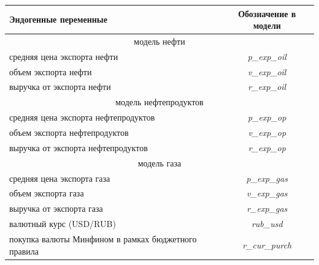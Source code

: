 \documentclass[a4paper, 14pt]{extarticle}
\begin{document}
	\begin{center}
		\small
		\begin{tabular}{ l | c }
			\toprule
			  Эндогенные переменные  &  Обозначение в модели  \\
			\midrule
			\multicolumn{2}{c}{модель нефти}\\
			\midrule
			 средняя цена экспорта нефти & \textit{ p\_exp\_oil } \\ 
			 объем экспорта нефти & \textit{ v\_exp\_oil } \\
			выручка от экспорта нефти &  \textit{ r\_exp\_oil } \\ 
			\midrule
			\multicolumn{2}{c}{модель нефтепродуктов} \\
			\midrule
			средняя цена экспорта нефтепродуктов & \textit{ p\_exp\_op } \\ 
			объем экспорта нефтепродуктов & \textit{ v\_exp\_op } \\
			выручка от экспорта нефтепродуктов &  \textit{ r\_exp\_op } \\ 
			\midrule
			\multicolumn{2}{c}{модель газа}\\
			\midrule
			средняя цена экспорта газа & \textit{ p\_exp\_gas } \\ 
			объем экспорта газа & \textit{ v\_exp\_gas } \\
			выручка от экспорта газа &  \textit{ r\_exp\_gas } \\ 
			\midrule
			валютный курс (USD/RUB) & \textit{ rub\_usd } \\ 
			\midrule
			покупка валюты Минфином в рамках бюджетного правила & \textit{ r\_cur\_purch } \\ 
			\bottomrule
		\end{tabular}
		\label{tab:2} 
	\end{center}
\end{document}
